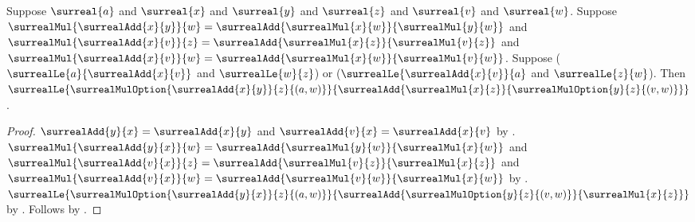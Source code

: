 \begin{lemma}\label{surreal_distributive_option_le_same_right}
    Suppose $\surreal{a}$ and $\surreal{x}$ and $\surreal{y}$ and
        $\surreal{z}$ and $\surreal{v}$ and $\surreal{w}$.
    Suppose
        $\surrealMul{\surrealAdd{x}{y}}{w}
            =\surrealAdd{\surrealMul{x}{w}}{\surrealMul{y}{w}}$ and
        $\surrealMul{\surrealAdd{x}{v}}{z}
            =\surrealAdd{\surrealMul{x}{z}}{\surrealMul{v}{z}}$ and
        $\surrealMul{\surrealAdd{x}{v}}{w}
            =\surrealAdd{\surrealMul{x}{w}}{\surrealMul{v}{w}}$.
    Suppose
        ($\surrealLe{a}{\surrealAdd{x}{v}}$ and
            $\surrealLe{w}{z}$) or
        ($\surrealLe{\surrealAdd{x}{v}}{a}$ and
            $\surrealLe{z}{w}$).
    Then
        $\surrealLe
            {\surrealMulOption{\surrealAdd{x}{y}}{z}{(a,w)}}
            {\surrealAdd{\surrealMul{x}{z}}
                {\surrealMulOption{y}{z}{(v,w)}}}$.
\end{lemma}
\begin{proof}
    $\surrealAdd{y}{x}=\surrealAdd{x}{y}$ and
        $\surrealAdd{v}{x}=\surrealAdd{x}{v}$
        by .
    $\surrealMul{\surrealAdd{y}{x}}{w}
        =\surrealAdd{\surrealMul{y}{w}}{\surrealMul{x}{w}}$ and
        $\surrealMul{\surrealAdd{v}{x}}{z}
        =\surrealAdd{\surrealMul{v}{z}}{\surrealMul{x}{z}}$ and
        $\surrealMul{\surrealAdd{v}{x}}{w}
        =\surrealAdd{\surrealMul{v}{w}}{\surrealMul{x}{w}}$
        by .
    $\surrealLe
        {\surrealMulOption{\surrealAdd{y}{x}}{z}{(a,w)}}
        {\surrealAdd{\surrealMulOption{y}{z}{(v,w)}}
            {\surrealMul{x}{z}}}$
        by .
    Follows by
        .
\end{proof}

